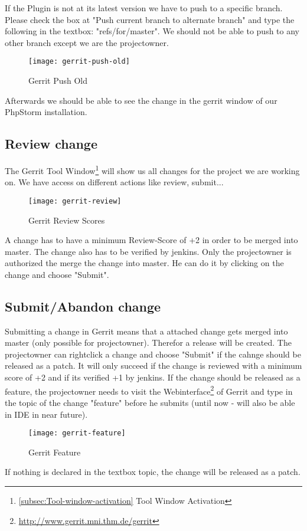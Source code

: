 If the Plugin is not at its latest version we have to push to a specific branch. Please check the box at "Push current branch to alternate branch" and type the following in the textbox: "refs/for/master". We should not be able to push to any other branch except we are the projectowner. 

\begin{figure}[H] 
	\centering
	\vspace{3pt}
	\texttt{[image: gerrit-push-old]}
	\caption{Gerrit Push Old}
\end{figure}

Afterwards we should be able to see the change in the gerrit window of our PhpStorm installation.

\subsection{Review change}
The Gerrit Tool Window\footnote{\ref{subsec:Tool-window-activation} Tool Window Activation} will show us all changes for the project we are working on. We have access on different actions like review, submit...

\begin{figure}[H] 
	\centering
	\vspace{3pt}
	\texttt{[image: gerrit-review]}
	\caption{Gerrit Review Scores}
\end{figure}

A change has to have a minimum Review-Score of +2 in order to be merged into master. The change also has to be verified by jenkins. Only the projectowner is authorized the merge the change into master. He can do it by clicking on the change and choose "Submit".

\subsection{Submit/Abandon change}
Submitting a change in Gerrit means that a attached change gets merged into master (only possible for projectowner). Therefor a release will be created. The projectowner can  rightclick a change and choose "Submit" if the cahnge should be released as a patch. It will only succeed if the change is reviewed with a minimum score of +2 and if its verified +1 by jenkins. If the change should be released as a feature, the projectowner needs to visit the Webinterface\footnote{\url{http://www.gerrit.mni.thm.de/gerrit}} of Gerrit and type in the topic of the change "feature" before he submits (until now - will also be able in IDE in near future). 

\begin{figure}[H] 
	\centering
	\vspace{3pt}
	\texttt{[image: gerrit-feature]}
	\caption{Gerrit Feature}
\end{figure}

If nothing is declared in the textbox topic, the change will be released as a patch.



